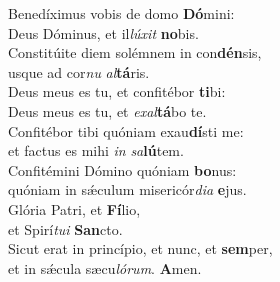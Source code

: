 \oddverse Benedíximus vobis de domo \textbf{Dó}mini:~\*\\
\oddverse Deus Dóminus, et il\textit{lú}\textit{xit} \textbf{no}bis.\\
\evenverse Constitúite diem solémnem in con\textbf{dén}sis,~\*\\
\evenverse usque ad cor\textit{nu} \textit{al}\textbf{tá}ris.\\
\oddverse Deus meus es tu, et confitébor \textbf{ti}bi:~\*\\
\oddverse Deus meus es tu, et \textit{e}\textit{xal}\textbf{tá}bo te.\\
\evenverse Confitébor tibi quóniam exau\textbf{dí}sti me:~\*\\
\evenverse et factus es mihi \textit{in} \textit{sa}\textbf{lú}tem.\\
\oddverse Confitémini Dómino quóniam \textbf{bo}nus:~\*\\
\oddverse quóniam in sǽculum misericór\textit{di}\textit{a} \textbf{e}jus.\\
\evenverse Glória Patri, et \textbf{Fí}lio,~\*\\
\evenverse et Spirí\textit{tu}\textit{i} \textbf{San}cto.\\
\oddverse Sicut erat in princípio, et nunc, et \textbf{sem}per,~\*\\
\oddverse et in sǽcula sæcu\textit{ló}\textit{rum}. \textbf{A}men.\\
